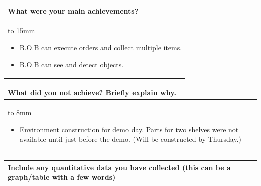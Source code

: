 \documentclass[a4paper]{article}
\newcommand{\colWidth}{141mm}
\begin{document}
\begin{center}

\begin{tabular}{|p{\colWidth}|}
	\hline
	\cellcolor{blue!25}\large
	\textbf{What were your main achievements?}
	\\ \hline
	\vtop to 15mm{
	\begin{itemize}
	    \item B.O.B can execute orders and collect multiple items.
	    \item B.O.B can see and detect objects.
	\end{itemize}
  }
  \\
  \hline
\end{tabular}
\vskip 5mm


\begin{tabular}{|p{\colWidth}|}
	\hline
	\cellcolor{blue!25}\large
	\textbf{What did you not achieve? Briefly explain why.}
	\\ \hline
	\vtop to 8mm{
	\begin{itemize}
	    \item Environment construction for demo day. Parts for two shelves were not available until just before the demo. (Will be constructed by Thursday.)
	\end{itemize}
  }
  \\
  \hline
\end{tabular}
\vskip 5mm



\newpage
\begin{tabular}{|p{\colWidth}|}
	\hline
	\cellcolor{blue!25}\large
	\textbf{Include any quantitative data you have collected (this can be a graph/table with a few words)}
  \\
  \hline
\end{tabular}


\end{center}
\end{document}
